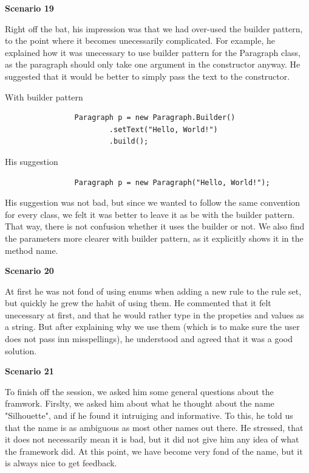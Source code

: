 \documentclass[12pt]{article}
\begin{document}
        \textbf{Scenario 19}

        Right off the bat, his impression was that we had over-used the builder pattern, to the point where it becomes unecessarily complicated. For example, he explained how it was unecessary to use builder pattern for the Paragraph class, as the paragraph should only take one argument in the constructor anyway. He suggested that it would be better to simply pass the text to the constructor.

        \begin{shaded}
            With builder pattern

            \begin{lstlisting}
                Paragraph p = new Paragraph.Builder()
                        .setText("Hello, World!")
                        .build();
            \end{lstlisting}

            His suggestion

            \begin{lstlisting}
                Paragraph p = new Paragraph("Hello, World!");
            \end{lstlisting}
        \end{shaded}

        His suggestion was not bad, but since we wanted to follow the same convention for every class, we felt it was better to leave it as be with the builder pattern. That way, there is not confusion whether it uses the builder or not. We also find the parameters more clearer with builder pattern, as it explicitly shows it in the method name.

        \textbf{Scenario 20}
        
        At first he was not fond of using enums when adding a new rule to the rule set, but quickly he grew the habit of using them. He commented that it felt unecessary at first, and that he would rather type in the propeties and values as a string. But after explaining why we use them (which is to make sure the user does not pass inn misspellings), he understood and agreed that it was a good solution.

        \textbf{Scenario 21}

        
                

        To finish off the session, we asked him some general questions about the framwork. Firslty, we asked him about what he thought about the name "Silhouette", and if he found it intruiging and informative. To this, he told us that the name is as ambiguous as most other names out there. He stressed, that it does not necessarily mean it is bad, but it did not give him any idea of what the framework did. At this point, we have become very fond of the name, but it is always nice to get feedback.
\end{document}
